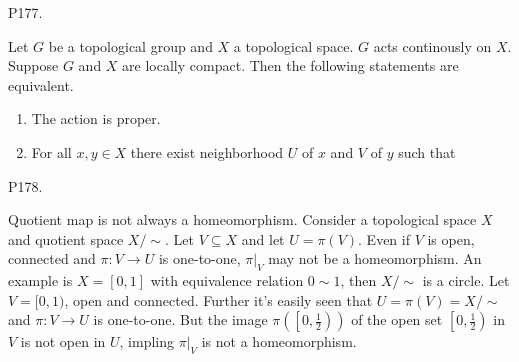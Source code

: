 \documentclass{note}
\begin{document}
\noindent P177.

\begin{proposition}
  Let $G$ be a topological group and $X$ a topological space. $G$ acts
  continously on $X$. Suppose $G$ and $X$ are locally compact. Then
  the following statements are equivalent.
  \begin{enumerate}
  \item The action is proper.
  \item For all $x,y\in X$ there exist neighborhood $U$ of $x$ and $V$
    of $y$ such that
  \end{enumerate}
\end{proposition}

\noindent P178.

Quotient map is not always a homeomorphism. Consider a topological
space $X$ and quotient space $X/{\sim}$. Let $V\subseteq X$ and let
$U=\pi(V)$. Even if $V$ is open, connected and $\pi\colon V\to U$ is
one-to-one, $\pi|_V$ may not be a homeomorphism. An example is
$X=[0,1]$ with equivalence relation $0\sim 1$, then $X/{\sim}$ is a
circle. Let $V=[0,1)$, open and connected. Further it's easily seen
that $U=\pi(V)=X/{\sim}$ and $\pi\colon V\to U$ is one-to-one. But the
image $\pi\left(\left[0,\frac{1}{2}\right)\right)$ of the open set
$\left[0,\frac{1}{2}\right)$ in $V$ is not open in $U$, impling
$\pi|_V$ is not a homeomorphism.
\end{document}
